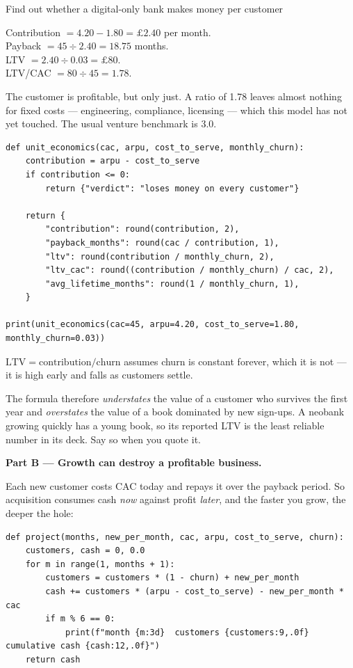 \begin{labproject}{Find out whether a digital-only bank makes money per customer}
\begin{workedexample}
\smallskip
Contribution $= 4.20 - 1.80 = \pounds2.40$ per month.\\
Payback $= 45 \div 2.40 = 18.75$ months.\\
LTV $= 2.40 \div 0.03 = \pounds80$.\\
LTV/CAC $= 80 \div 45 = 1.78$.

\smallskip
The customer is profitable, but only just. A ratio of 1.78 leaves almost nothing for fixed costs --- engineering, compliance, licensing --- which this model has not yet touched. The usual venture benchmark is 3.0.
\end{workedexample}

\begin{lstlisting}[style=mlpython]
def unit_economics(cac, arpu, cost_to_serve, monthly_churn):
    contribution = arpu - cost_to_serve
    if contribution <= 0:
        return {"verdict": "loses money on every customer"}

    return {
        "contribution": round(contribution, 2),
        "payback_months": round(cac / contribution, 1),
        "ltv": round(contribution / monthly_churn, 2),
        "ltv_cac": round((contribution / monthly_churn) / cac, 2),
        "avg_lifetime_months": round(1 / monthly_churn, 1),
    }

print(unit_economics(cac=45, arpu=4.20, cost_to_serve=1.80, monthly_churn=0.03))
\end{lstlisting}

\begin{pitfall}
$\text{LTV} = \text{contribution} / \text{churn}$ assumes churn is constant forever, which it is not --- it is high early and falls as customers settle.

The formula therefore \emph{understates} the value of a customer who survives the first year and \emph{overstates} the value of a book dominated by new sign-ups. A neobank growing quickly has a young book, so its reported LTV is the least reliable number in its deck. Say so when you quote it.
\end{pitfall}

\medskip\noindent\textbf{Part B --- Growth can destroy a profitable business.}\par
Each new customer costs CAC today and repays it over the payback period. So acquisition consumes cash \emph{now} against profit \emph{later}, and the faster you grow, the deeper the hole:

\begin{lstlisting}[style=mlpython]
def project(months, new_per_month, cac, arpu, cost_to_serve, churn):
    customers, cash = 0, 0.0
    for m in range(1, months + 1):
        customers = customers * (1 - churn) + new_per_month
        cash += customers * (arpu - cost_to_serve) - new_per_month * cac
        if m % 6 == 0:
            print(f"month {m:3d}  customers {customers:9,.0f}  cumulative cash {cash:12,.0f}")
    return cash


\end{lstlisting}
\end{labproject}
